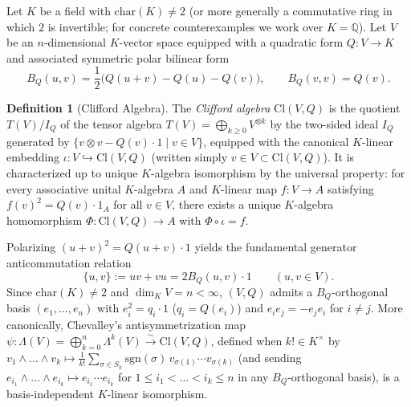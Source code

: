 \documentclass[11pt]{article}
\newcommand{\coloneqq}{\mathrel{:=}}
\theoremstyle{plain}
\theoremstyle{definition}
\newtheorem{definition}[theorem]{Definition}
\theoremstyle{remark}
\newcommand{\Cl}{\mathrm{Cl}}
\begin{document}
Let $K$ be a field with $\mathrm{char}(K) \neq 2$ (or more generally a commutative ring in which $2$ is invertible; for concrete counterexamples we work over $K = \mathbb{Q}$). Let $V$ be an $n$-dimensional $K$-vector space equipped with a quadratic form $Q : V \to K$ and associated symmetric polar bilinear form
\begin{equation}\label{eq:polar}
  B_Q(u, v) = \frac{1}{2}\bigl(Q(u + v) - Q(u) - Q(v)\bigr), \qquad B_Q(v, v) = Q(v).
\end{equation}

\begin{definition}[Clifford Algebra]\label{def:clifford}
The \emph{Clifford algebra} $\Cl(V, Q)$ is the quotient $T(V) / I_Q$ of the tensor algebra $T(V) = \bigoplus_{k \ge 0} V^{\otimes k}$ by the two-sided ideal $I_Q$ generated by $\{v \otimes v - Q(v)\cdot 1 \mid v \in V\}$, equipped with the canonical $K$-linear embedding $\iota : V \hookrightarrow \Cl(V, Q)$ (written simply $v \in V \subset \Cl(V, Q)$). It is characterized up to unique $K$-algebra isomorphism by the universal property: for every associative unital $K$-algebra $A$ and $K$-linear map $f : V \to A$ satisfying $f(v)^2 = Q(v)\cdot 1_A$ for all $v \in V$, there exists a unique $K$-algebra homomorphism $\Phi : \Cl(V, Q) \to A$ with $\Phi \circ \iota = f$.
\end{definition}

Polarizing $(u + v)^2 = Q(u + v)\cdot 1$ yields the fundamental generator anticommutation relation
\begin{equation}\label{eq:polar-clifford}
  \{u, v\} \coloneqq u v + v u = 2 B_Q(u, v)\cdot 1 \qquad (u, v \in V).
\end{equation}
Since $\mathrm{char}(K) \neq 2$ and $\dim_K V = n < \infty$, $(V, Q)$ admits a $B_Q$-orthogonal basis $(e_1, \dots, e_n)$ with $e_i^2 = q_i \cdot 1$ ($q_i = Q(e_i)$) and $e_i e_j = -e_j e_i$ for $i \neq j$. More canonically, Chevalley's antisymmetrization map $\psi : \Lambda(V) = \bigoplus_{k=0}^n \Lambda^k(V) \xrightarrow{\sim} \Cl(V, Q)$, defined when $k! \in K^\times$ by $v_1 \wedge \dots \wedge v_k \mapsto \frac{1}{k!}\sum_{\sigma \in S_k} \mathrm{sgn}(\sigma)\,v_{\sigma(1)}\cdots v_{\sigma(k)}$ (and sending $e_{i_1} \wedge \dots \wedge e_{i_k} \mapsto e_{i_1}\cdots e_{i_k}$ for $1 \le i_1 < \dots < i_k \le n$ in any $B_Q$-orthogonal basis), is a basis-independent $K$-linear isomorphism.
\end{document}
